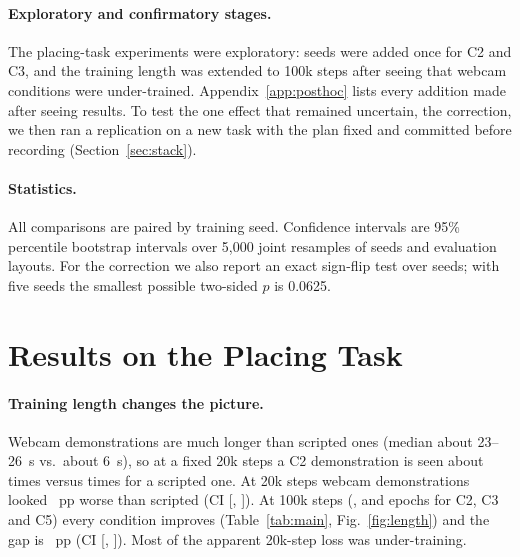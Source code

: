 \documentclass[10pt]{article}
\newcommand{\condII}{C2}
\newcommand{\condIII}{C3}
\newcommand{\condV}{C5}
\begin{document}
\paragraph{Exploratory and confirmatory stages.}
The placing-task experiments were exploratory: seeds were added once for \condII{} and \condIII{}, and the training length was extended to 100k steps after seeing that webcam conditions were under-trained.
Appendix~\ref{app:posthoc} lists every addition made after seeing results.
To test the one effect that remained uncertain, the correction, we then ran a replication on a new task with the plan fixed and committed before recording (Section~\ref{sec:stack}).

\paragraph{Statistics.}
All comparisons are paired by training seed.
Confidence intervals are 95\% percentile bootstrap intervals over 5,000 joint resamples of seeds and evaluation layouts.
For the correction we also report an exact sign-flip test over seeds; with five seeds the smallest possible two-sided $p$ is 0.0625.

\section{Results on the Placing Task}

\begin{table}[t]
\centering
\caption{Successes out of 100 held-out layouts. 20k steps: five seeds for every condition. 100k steps: five seeds for \condII{} and \condIII{}, three for the others.}
\label{tab:main}
\small

\end{table}

\begin{table}[t]
\centering
\caption{Paired comparisons at 100k steps (pp, successes out of 100). Only seeds present for both conditions are paired.}
\label{tab:comp}
\small

\end{table}

\paragraph{Training length changes the picture.}
Webcam demonstrations are much longer than scripted ones (median about 23--26~s vs.\ about 6~s), so at a fixed 20k steps a \condII{} demonstration is seen about \epochCTwoShort{} times versus \epochCOneShort{} times for a scripted one.
At 20k steps webcam demonstrations looked \lossShortMean{}~pp worse than scripted (CI [\lossShortLo, \lossShortHi]).
At 100k steps (\epochCTwo{}, \epochCThree{} and \epochCFive{} epochs for \condII{}, \condIII{} and \condV{}) every condition improves (Table~\ref{tab:main}, Fig.~\ref{fig:length}) and the gap is \lossMean{}~pp (CI [\lossLo, \lossHi]).
Most of the apparent 20k-step loss was under-training.
\end{document}
